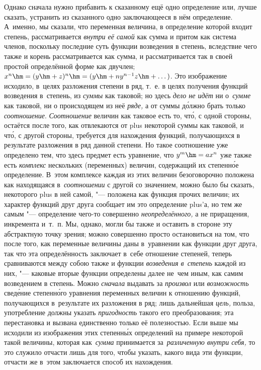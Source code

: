 Однако сначала нужно прибавить к сказанному ещё одно определение или, лучше
сказать, устранить из сказанного одно заключающееся в нём определение.
А~именно, мы сказали, что переменная величина, в определение которой входит
степень, рассматривается {\em внутри её самой} как сумма и притом как система
членов, поскольку последние суть функции возведения в степень, вследствие чего
также и корень рассматривается как сумма, и рассматривается так в своей простой
определённой форме как двучлен;
$x^n\hm=(y\hm+z)^n\hm=(y\hm+ny^{n-1}z\hm+\dots)$. Это изображение исходило,
в~целях разложения степени в ряд, т.~е. в целях получения функций возведения
в~степень, из {\em суммы} как таковой; но здесь {\em дело не идёт} ни
о~{\em сумме} как таковой, ни о происходящем из неё {\em ряде,} а от суммы
д\'{о}лжно брать только {\em соотношение}. {\em Соотношение} величин как
таковое есть то, чт\'{о}, с одной стороны, остаётся после того, как отвлекаются от
plus некоторой суммы как таковой, и чт\'{о}, с другой стороны, требуется для
нахождения функций, получающихся в результате разложения в ряд данной степени.
Но такое соотношение уже определено тем, что здесь предмет есть уравнение, что
$y^m\hm=ax^n$ уже также есть {\em комплекс} нескольких (переменных) величин,
содержащий их степенн\'{о}е определение. В~этом комплексе каждая из этих
величин безоговорочно положена как находящаяся в~{\em соотношении} с другой со
значением, можно было бы сказать, некоторого plus в ней самой, "--- положена
как функция прочих величин; их характер функций друг друга сообщает им это
определение plus'а, но тем же самым "--- определение чего-то совершенно
{\em неопределённого,} а не приращения, инкремента и~т.~п. Мы, однако, могли бы
также и оставить в стороне эту абстрактную точку зрения; можно совершенно
просто остановиться на том, что после того, как переменные величины даны
в~уравнении как функции друг друга, так что эта определённость заключает в~себе
отношение степеней, теперь сравниваются между собою также и функции
{\em возведения в~степень} каждой из них, "--- каковые вторые функции
определены далее не~чем иным, как самим возведением в степень. Можно
{\em сначала} выдавать за {\em произвол} или {\em возможность} свед\'{е}ние
степенн\'{о}го уравнения переменных величин к отношению функций, получающихся
в~результате их разложения в ряд; лишь дальнейшая {\em цель,} польза,
употребление должны указать {\em пригодность} такого его преобразования; эта
перестановка и вызвана единственно только её полезностью. Если выше мы исходили
из изображения этих степенн\'{ы}х определений на примере некоторой такой величины,
которая как~{\em сумма} принимается за~{\em различенную внутри себя,} то это
служило отчасти лишь для того, чтобы указать, какого вида эти функции, отчасти
же в~этом заключается способ их нахождения.

